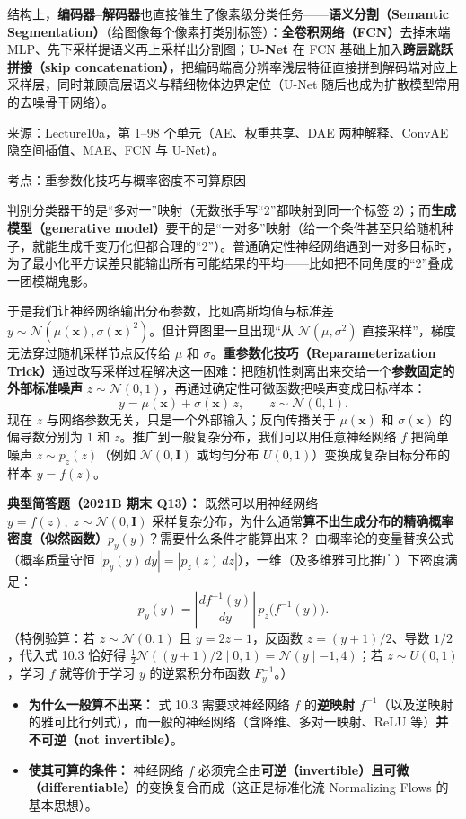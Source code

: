 结构上，\textbf{编码器–解码器}也直接催生了像素级分类任务——\textbf{语义分割（Semantic Segmentation）}（给图像每个像素打类别标签）：\textbf{全卷积网络（FCN）}去掉末端 MLP、先下采样提语义再上采样出分割图；\textbf{U-Net} 在 FCN 基础上加入\textbf{跨层跳跃拼接（skip concatenation）}，把编码端高分辨率浅层特征直接拼到解码端对应上采样层，同时兼顾高层语义与精细物体边界定位（U-Net 随后也成为扩散模型常用的去噪骨干网络）。

来源：Lecture10a，第 1–98 个单元（AE、权重共享、DAE 两种解释、ConvAE 隐空间插值、MAE、FCN 与 U-Net）。



考点：重参数化技巧与概率密度不可算原因 

判别分类器干的是“多对一”映射（无数张手写“2”都映射到同一个标签 2）；而\textbf{生成模型（generative model）}要干的是“一对多”映射（给一个条件甚至只给随机种子，就能生成千变万化但都合理的“2”）。普通确定性神经网络遇到一对多目标时，为了最小化平方误差只能输出所有可能结果的平均——比如把不同角度的“2”叠成一团模糊鬼影。

于是我们让神经网络输出分布参数，比如高斯均值与标准差 $y\sim\mathcal{N}(\mu(\mathbf{x}),\sigma(\mathbf{x})^2)$。但计算图里一旦出现“从 $\mathcal{N}(\mu,\sigma^2)$ 直接采样”，梯度无法穿过随机采样节点反传给 $\mu$ 和 $\sigma$。\textbf{重参数化技巧（Reparameterization Trick）}通过改写采样过程解决这一困难：把随机性剥离出来交给一个\textbf{参数固定的外部标准噪声} $z\sim\mathcal{N}(0,1)$，再通过确定性可微函数把噪声变成目标样本：
\[
y = \mu(\mathbf{x}) + \sigma(\mathbf{x})\,z, \qquad z \sim \mathcal{N}(0, 1).
\tag{10.2}
\]
现在 $z$ 与网络参数无关，只是一个外部输入；反向传播关于 $\mu(\mathbf{x})$ 和 $\sigma(\mathbf{x})$ 的偏导数分别为 $1$ 和 $z$。推广到一般复杂分布，我们可以用任意神经网络 $f$ 把简单噪声 $z\sim p_z(z)$（例如 $\mathcal{N}(0,\mathbf{I})$ 或均匀分布 $U(0,1)$）变换成复杂目标分布的样本 $y = f(z)$。

\textbf{典型简答题（2021B 期末 Q13）：} 既然可以用神经网络 $y = f(z),\; z\sim\mathcal{N}(0,\mathbf{I})$ 采样复杂分布，为什么通常\textbf{算不出生成分布的精确概率密度（似然函数）$p_y(y)$}？需要什么条件才能算出来？
由概率论的变量替换公式（概率质量守恒 $|p_y(y)\,dy| = |p_z(z)\,dz|$），一维（及多维雅可比推广）下密度满足：
\[
p_y(y) = \left|\frac{df^{-1}(y)}{dy}\right|\,p_z\bigl(f^{-1}(y)\bigr).
\tag{10.3}
\]
（特例验算：若 $z\sim\mathcal{N}(0,1)$ 且 $y=2z-1$，反函数 $z=(y+1)/2$、导数 $1/2$，代入式 10.3 恰好得 $\frac{1}{2}\mathcal{N}((y+1)/2\mid 0,1)=\mathcal{N}(y\mid -1,4)$；若 $z\sim U(0,1)$，学习 $f$ 就等价于学习 $y$ 的逆累积分布函数 $F_y^{-1}$。）
\begin{itemize}
\item \textbf{为什么一般算不出来：} 式 10.3 需要求神经网络 $f$ 的\textbf{逆映射 $f^{-1}$}（以及逆映射的雅可比行列式），而一般的神经网络（含降维、多对一映射、ReLU 等）\textbf{并不可逆（not invertible）}。
\item \textbf{使其可算的条件：} 神经网络 $f$ 必须完全由\textbf{可逆（invertible）且可微（differentiable）}的变换复合而成（这正是标准化流 Normalizing Flows 的基本思想）。
\end{itemize}

